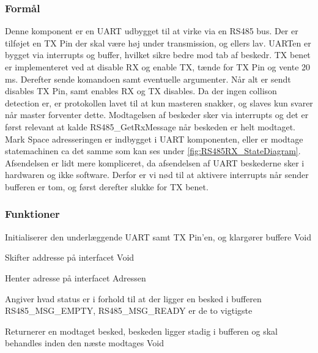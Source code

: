 \subsubsection{Formål}
Denne komponent er en UART udbygget til at virke via en RS485 bus. 
Der er tilføjet en TX Pin der skal være høj under transmission, og 
ellers lav. UARTen er bygget via interrupts og buffer, 
hvilket sikre bedre mod tab af beskedr. TX benet er implementeret ved 
at disable RX og enable TX, tænde for TX Pin og vente 20 ms. Derefter 
sende komandoen samt eventuelle argumenter. Når alt er sendt disables 
TX Pin, samt enables RX og TX disables. Da der ingen collison detection 
er, er protokollen lavet til at kun masteren snakker, og slaves kun 
svarer når master forventer dette. Modtagelsen af beskeder sker via interrupts 
og det er først relevant at kalde RS485\_GetRxMessage når beskeden er helt 
modtaget. Mark Space adresseringen er indbygget i UART komponenten, eller 
er modtage statemachinen ca det samme som kan ses under \ref{fig:RS485RX_StateDiagram}. 
Afsendelsen er lidt mere kompliceret, da afsendelsen af UART beskederne sker 
i hardwaren og ikke software. Derfor er vi nød til at aktivere interrupts 
når sender bufferen er tom, og først derefter slukke for TX benet.


\subsubsection{Funktioner}

{Initialiserer den underlæggende UART samt 
TX Pin'en, og klargører buffere}
{Void}
{}

{Skifter addresse på interfacet}
{Void}
{
}

{Henter adresse på interfacet}
{Adressen}
{}

{Angiver hvad status er i forhold til at der ligger en besked i bufferen}
{RS485\_MSG\_EMPTY, RS485\_MSG\_READY er de to vigtigste}
{}

{Returnerer en modtaget besked, beskeden ligger stadig i bufferen og skal behandles inden den næste modtages}
{Void}
{
}

